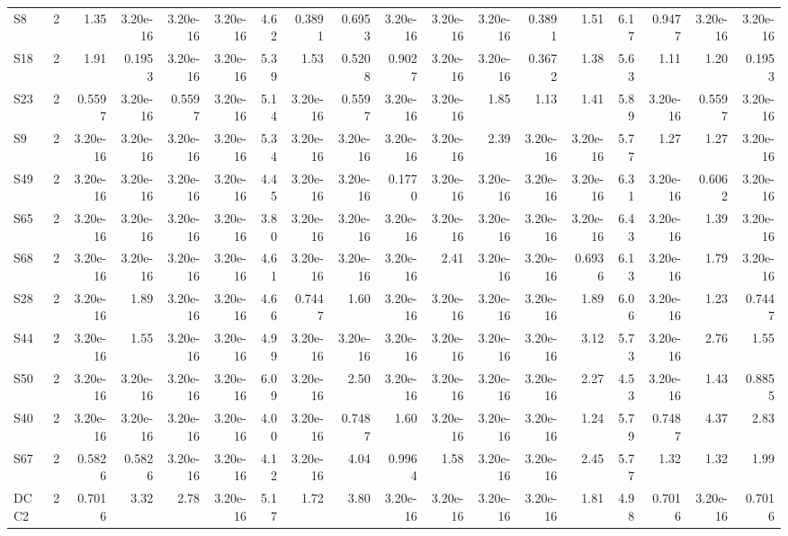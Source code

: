 {\begin{longtable}{lrrrrrrrrrrrrrrrrr}
  S8 & 2 & 1.35 & 3.20e-16 & 3.20e-16 & 3.20e-16 & 4.62 & 0.3891 & 0.6953 & 3.20e-16 & 3.20e-16 & 3.20e-16 & 0.3891 & 1.51 & 6.17 & 0.9477 & 3.20e-16 & 3.20e-16 \\
  S18 & 2 & 1.91 & 0.1953 & 3.20e-16 & 3.20e-16 & 5.39 & 1.53 & 0.5208 & 0.9027 & 3.20e-16 & 3.20e-16 & 0.3672 & 1.38 & 5.63 & 1.11 & 1.20 & 0.1953 \\
  S23 & 2 & 0.5597 & 3.20e-16 & 0.5597 & 3.20e-16 & 5.14 & 3.20e-16 & 0.5597 & 3.20e-16 & 3.20e-16 & 1.85 & 1.13 & 1.41 & 5.89 & 3.20e-16 & 0.5597 & 3.20e-16 \\
  S9 & 2 & 3.20e-16 & 3.20e-16 & 3.20e-16 & 3.20e-16 & 5.34 & 3.20e-16 & 3.20e-16 & 3.20e-16 & 3.20e-16 & 2.39 & 3.20e-16 & 3.20e-16 & 5.77 & 1.27 & 1.27 & 3.20e-16 \\
  S49 & 2 & 3.20e-16 & 3.20e-16 & 3.20e-16 & 3.20e-16 & 4.45 & 3.20e-16 & 3.20e-16 & 0.1770 & 3.20e-16 & 3.20e-16 & 3.20e-16 & 3.20e-16 & 6.31 & 3.20e-16 & 0.6062 & 3.20e-16 \\
  S65 & 2 & 3.20e-16 & 3.20e-16 & 3.20e-16 & 3.20e-16 & 3.80 & 3.20e-16 & 3.20e-16 & 3.20e-16 & 3.20e-16 & 3.20e-16 & 3.20e-16 & 3.20e-16 & 6.43 & 3.20e-16 & 1.39 & 3.20e-16 \\
  S68 & 2 & 3.20e-16 & 3.20e-16 & 3.20e-16 & 3.20e-16 & 4.61 & 3.20e-16 & 3.20e-16 & 3.20e-16 & 2.41 & 3.20e-16 & 3.20e-16 & 0.6936 & 6.13 & 3.20e-16 & 1.79 & 3.20e-16 \\
  S28 & 2 & 3.20e-16 & 1.89 & 3.20e-16 & 3.20e-16 & 4.66 & 0.7447 & 1.60 & 3.20e-16 & 3.20e-16 & 3.20e-16 & 3.20e-16 & 1.89 & 6.06 & 3.20e-16 & 1.23 & 0.7447 \\
  S44 & 2 & 3.20e-16 & 1.55 & 3.20e-16 & 3.20e-16 & 4.99 & 3.20e-16 & 3.20e-16 & 3.20e-16 & 3.20e-16 & 3.20e-16 & 3.20e-16 & 3.12 & 5.73 & 3.20e-16 & 2.76 & 1.55 \\
  S50 & 2 & 3.20e-16 & 3.20e-16 & 3.20e-16 & 3.20e-16 & 6.09 & 3.20e-16 & 2.50 & 3.20e-16 & 3.20e-16 & 3.20e-16 & 3.20e-16 & 2.27 & 4.53 & 3.20e-16 & 1.43 & 0.8855 \\
  S40 & 2 & 3.20e-16 & 3.20e-16 & 3.20e-16 & 3.20e-16 & 4.00 & 3.20e-16 & 0.7487 & 1.60 & 3.20e-16 & 3.20e-16 & 3.20e-16 & 1.24 & 5.79 & 0.7487 & 4.37 & 2.83 \\
  S67 & 2 & 0.5826 & 0.5826 & 3.20e-16 & 3.20e-16 & 4.12 & 3.20e-16 & 4.04 & 0.9964 & 1.58 & 3.20e-16 & 3.20e-16 & 2.45 & 5.77 & 1.32 & 1.32 & 1.99 \\
  DCC2 & 2 & 0.7016 & 3.32 & 2.78 & 3.20e-16 & 5.17 & 1.72 & 3.80 & 3.20e-16 & 3.20e-16 & 3.20e-16 & 3.20e-16 & 1.81 & 4.98 & 0.7016 & 3.20e-16 & 0.7016 \\

\end{longtable}}
